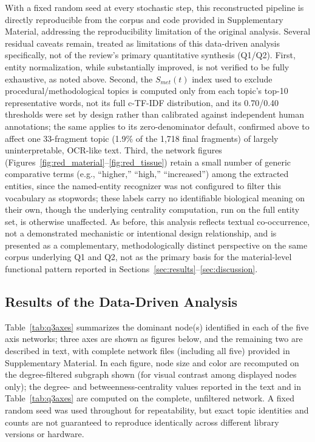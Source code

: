 \documentclass[5p,times,twocolumn]{elsarticle}
\begin{document}
With a fixed random seed at every stochastic step, this reconstructed pipeline is directly reproducible from the corpus and code provided in Supplementary Material, addressing the reproducibility limitation of the original analysis. Several residual caveats remain, treated as limitations of this data-driven analysis specifically, not of the review's primary quantitative synthesis (Q1/Q2). First, entity normalization, while substantially improved, is not verified to be fully exhaustive, as noted above. Second, the $S_{met}(t)$ index used to exclude procedural/methodological topics is computed only from each topic's top-10 representative words, not its full c-TF-IDF distribution, and its 0.70/0.40 thresholds were set by design rather than calibrated against independent human annotations; the same applies to its zero-denominator default, confirmed above to affect one 33-fragment topic (1.9\% of the 1,718 final fragments) of largely uninterpretable, OCR-like text. Third, the network figures (Figures~\ref{fig:red_material}--\ref{fig:red_tissue}) retain a small number of generic comparative terms (e.g., ``higher,'' ``high,'' ``increased'') among the extracted entities, since the named-entity recognizer was not configured to filter this vocabulary as stopwords; these labels carry no identifiable biological meaning on their own, though the underlying centrality computation, run on the full entity set, is otherwise unaffected. As before, this analysis reflects textual co-occurrence, not a demonstrated mechanistic or intentional design relationship, and is presented as a complementary, methodologically distinct perspective on the same corpus underlying Q1 and Q2, not as the primary basis for the material-level functional pattern reported in Sections~\ref{sec:results}--\ref{sec:discussion}.

\subsection{Results of the Data-Driven Analysis}

Table~\ref{tab:q3axes} summarizes the dominant node(s) identified in each of the five axis networks; three axes are shown as figures below, and the remaining two are described in text, with complete network files (including all five) provided in Supplementary Material. In each figure, node size and color are recomputed on the degree-filtered subgraph shown (for visual contrast among displayed nodes only); the degree- and betweenness-centrality values reported in the text and in Table~\ref{tab:q3axes} are computed on the complete, unfiltered network. A fixed random seed was used throughout for repeatability, but exact topic identities and counts are not guaranteed to reproduce identically across different library versions or hardware.
\end{document}
